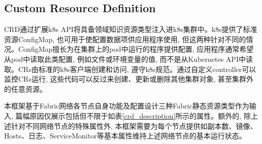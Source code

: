 \subsection{Custom Resource Definition}\label{section: Custom_Resource_Definition}

CRD通过扩展k8s API将具备领域知识资源类型注入进k8s集群中。k8s提供了标准资源ConfigMap, 也可用于使配置数据项供应用程序使用, 但这两种针对不同的情况。ConfigMap擅长为在集群上的pod中运行的程序提供配置, 应用程序通常希望从pod中读取此类配置, 例如文件或环境变量的值, 而不是从Kubernetes API中读取。CRs由标准的k8s客户端创建和访问, 遵守k8s规范。通过自定义controller可以监控CRs运行, 这些代码可以反过来创建、更新或删除其他集群对象, 甚至集群外的任意资源。

本框架基于Fabric网络各节点自身功能及配置\footnotemark[1]\footnotemark[2]\footnotemark[3]设计三种Fabric静态资源类型作为输入, 篇幅原因仅展示包括但不限于如表\ref{crd_description}所示的属性。额外的, 除上述针对不同网络节点的特殊属性外, 本框架需要为每个节点提供如副本数、镜像、Hosts、日志、ServiceMonitor等基本属性维持上述网络节点的基本运行状态。

